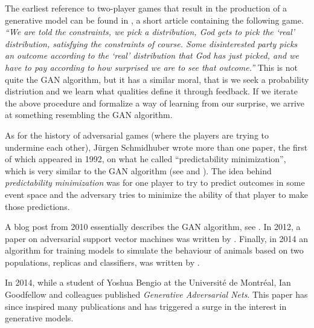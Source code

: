 The earliest reference to two-player games that result in the
production of a generative model can be found in \cite{ref:doyle}, a
short article containing the following game. \textit{``We are told the
constraints, we pick a distribution, God gets to pick the `real'
distribution, satisfying the constraints of course. Some disinterested
party picks an outcome according to the `real' distribution that God
has just picked, and we have to pay according to how surprised we are
to see that outcome.''} This is not quite the GAN algorithm, but it
has a similar moral, that is we seek a probability distriution and we
learn what qualities define it through feedback. If we iterate the
above procedure and formalize a way of learning from our surprise, we
arrive at something resembling the GAN algorithm.

As for the history of adversarial games (where the players are trying
to undermine each other), J\"{u}rgen Schmidhuber wrote more than one
paper, the first of which appeared in 1992, on what he called
``predictability minimization'', which is very similar to the GAN
algorithm (see \cite{ref:schmidhuber-1992} and
\cite{ref:schmidhuber-2018}). The idea behind \textit{predictability
minimization} was for one player to try to predict outcomes in some
event space and the adversary tries to minimize the ability of that
player to make those predictions.

A blog post from 2010 essentially describes the GAN algorithm, see
\cite{ref:niemitalo-2010}. In 2012, a paper on adversarial support
vector machines was written by \cite{ref:zhou-2012}. Finally, in 2014
an algorithm for training models to simulate the behaviour of animals
based on two populations, replicas and classifiers, was written by
\cite{ref:li-2014}.

In 2014, while a student of Yoshua Bengio at the Universit\'{e} de
Montr\'{e}al, Ian Goodfellow and colleagues published
\textit{Generative Adversarial Nets}.  This paper has since inspired
many publications and has triggered a surge in the interest in
generative models.

